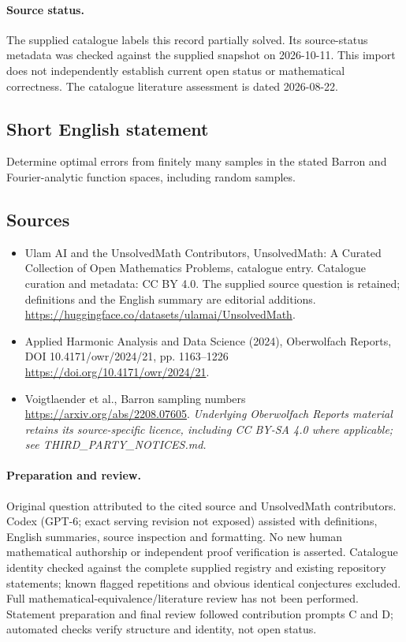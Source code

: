 \documentclass[11pt]{article}
\begin{document}
\paragraph{Source status.}
The supplied catalogue labels this record partially solved. Its source-status metadata was checked against the supplied snapshot on 2026-10-11. This import does not independently establish current open status or mathematical correctness. The catalogue literature assessment is dated 2026-08-22.
\subsection{Short English statement}
Determine optimal errors from finitely many samples in the stated Barron and Fourier-analytic function spaces, including random samples.
\subsection{Sources}
\begin{itemize}
\item[S1] Ulam AI and the UnsolvedMath Contributors, UnsolvedMath: A Curated Collection of Open Mathematics Problems, catalogue entry. Catalogue curation and metadata: CC BY 4.0. The supplied source question is retained; definitions and the English summary are editorial additions.
\url{https://huggingface.co/datasets/ulamai/UnsolvedMath}.
\item[S2] Applied Harmonic Analysis and Data Science (2024), Oberwolfach Reports, DOI 10.4171/owr/2024/21, pp. 1163--1226
\url{https://doi.org/10.4171/owr/2024/21}.
\item[S3] Voigtlaender et al., Barron sampling numbers
\url{https://arxiv.org/abs/2208.07605}.
\textit{Underlying Oberwolfach Reports material retains its source-specific licence, including CC BY-SA 4.0 where applicable; see THIRD\_PARTY\_NOTICES.md.}
\end{itemize}
\paragraph{Preparation and review.}
Original question attributed to the cited source and UnsolvedMath contributors. Codex (GPT-6; exact serving revision not exposed) assisted with definitions, English summaries, source inspection and formatting. No new human mathematical authorship or independent proof verification is asserted. Catalogue identity checked against the complete supplied registry and existing repository statements; known flagged repetitions and obvious identical conjectures excluded. Full mathematical-equivalence/literature review has not been performed. Statement preparation and final review followed contribution prompts C and D; automated checks verify structure and identity, not open status.
\label{end:statement}
\end{document}
